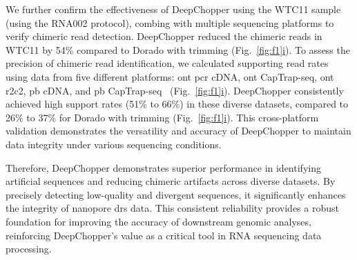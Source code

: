 \documentclass[pdflatex,sn-nature, lineno]{sn-jnl}%
\newcommand{\figref}[2]{Fig.~\hyperref[#1]{\ref*{#1}#2}}
\theoremstyle{thmstyleone}%
\theoremstyle{thmstyletwo}%
\theoremstyle{thmstylethree}%
\begin{document}
We further confirm the effectiveness of DeepChopper using the WTC11 sample (using the RNA002 protocol), combing with multiple sequencing platforms to verify chimeric read detection.
DeepChopper reduced the chimeric reads in WTC11 by 54\% compared to Dorado with trimming (\figref{fig:f1}{i}).
To assess the precision of chimeric read identification, we calculated supporting read rates using data from five different platforms: \gls{ont} \gls{pcr} cDNA, \gls{ont} CapTrap-seq, \gls{ont} \gls{r2c2}, \gls{pb} cDNA, and \gls{pb} CapTrap-seq~\cite{carbonell2024captrap} (\figref{fig:f1}{i}).
DeepChopper consistently achieved high support rates (51\% to 66\%) in these diverse datasets, compared to 26\% to 37\% for Dorado with trimming (\figref{fig:f1}{i}).
This cross-platform validation demonstrates the versatility and accuracy of DeepChopper to maintain data integrity under various sequencing conditions.

Therefore, DeepChopper demonstrates superior performance in identifying artificial sequences and reducing chimeric artifacts across diverse datasets.
By precisely detecting low-quality and divergent sequences, it significantly enhances the integrity of nanopore \gls{drs} data.
This consistent reliability provides a robust foundation for improving the accuracy of downstream genomic analyses, reinforcing DeepChopper's value as a critical tool in RNA sequencing data processing.
\end{document}
